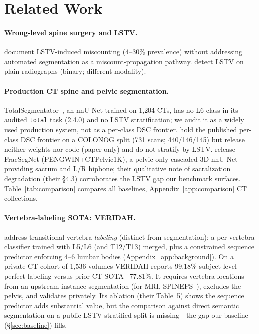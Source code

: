 \documentclass{article}
\newcommand{\TS}{TotalSegmentator}
\newcommand{\VERIDAH}{VERIDAH}
\begin{document}
\section{Related Work}
\label{sec:related}

\paragraph{Wrong-level spine surgery and LSTV.}
\citep{Konin2010LumbosacralRelevance,Carrino2011EffectImaging,Sekharappa2014LumbosacralSignificance}
document LSTV-induced miscounting (4--30\% prevalence) without
addressing automated segmentation as a miscount-propagation
pathway. \citet{Kwak2025AutomatedModel} detect LSTV on plain
radiographs (binary; different modality).

\paragraph{Production CT spine and pelvic segmentation.}
\TS{}~\citep{Wasserthal2023TotalSegmentator:Images}, an nnU-Net
trained on 1{,}204 CTs, has no L6 class in its audited
\texttt{total} task (2.4.0) and no LSTV stratification; we audit it as
a widely used production system, not as a per-class DSC
frontier.
\citet{Li2025LumbarMechanism} hold the published per-class
DSC frontier on a COLONOG split (731 scans; 440/146/145)
but release neither weights nor code (paper-only) and do
not stratify by LSTV. \citet{Liu2025AutomaticDataset}
release FracSegNet (PENGWIN+CTPelvic1K), a pelvic-only
cascaded 3D nnU-Net providing sacrum and L/R hipbone; their
qualitative note of sacralization degradation (their
\S4.3) corroborates the LSTV gap our benchmark surfaces.
Table~\ref{tab:comparison} compares all baselines,
Appendix~\ref{app:comparison} CT collections.

\paragraph{Vertebra-labeling SOTA: \VERIDAH{}.}
\citet{Moller2026VERIDAH:Sequences} address transitional-vertebra
\emph{labeling} (distinct from segmentation): a per-vertebra
classifier trained with L5/L6 (and T12/T13) merged, plus a
constrained sequence predictor enforcing 4--6 lumbar bodies
(Appendix~\ref{app:background}). On a private CT cohort of 1{,}536
volumes \VERIDAH{} reports 99.18\% subject-level perfect
labeling versus prior CT SOTA~\citep{Meng2022VertebraeMLMI}
77.81\%. It requires vertebra locations from an upstream
instance segmentation (for MRI,
SPINEPS~\citep{Moller2024SPINEPSautomaticSegmentation}),
excludes the pelvis, and validates privately. Its ablation
(their Table~5) shows the sequence predictor adds substantial
value, but the comparison against direct semantic
segmentation on a public LSTV-stratified split is
missing---the gap our baseline (\S\ref{sec:baseline}) fills.
\end{document}

